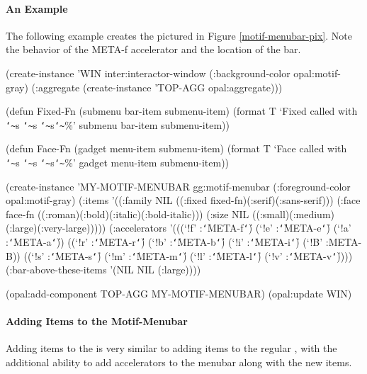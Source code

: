 \begin{group}
\paragraph{An Example}

The following example creates the  pictured in Figure
\ref{motif-menubar-pix}.  Note the behavior of the META-f accelerator and the
location of the bar.


\begin{programexample}
(create-instance 'WIN inter:interactor-window
  (:background-color opal:motif-gray)
  (:aggregate (create-instance 'TOP-AGG opal:aggregate)))

(defun Fixed-Fn (submenu bar-item submenu-item)
  (format T `Fixed called with {\tt\char`\~}s {\tt\char`\~}s {\tt\char`\~}s{\tt\char`\~}\%' submenu bar-item submenu-item))

(defun Face-Fn (gadget menu-item submenu-item)
  (format T `Face called with {\tt\char`\~}s {\tt\char`\~}s {\tt\char`\~}s{\tt\char`\~}\%'
	  gadget menu-item submenu-item))

(create-instance 'MY-MOTIF-MENUBAR gg:motif-menubar
  (:foreground-color opal:motif-gray)
  (:items
   '((:family NIL
	      ((:fixed fixed-fn)(:serif)(:sans-serif)))
     (:face face-fn
	    ((:roman)(:bold)(:italic)(:bold-italic)))
     (:size NIL
	    ((:small)(:medium)(:large)(:very-large)))))
  (:accelerators
   '(((`!f' :{\tt\char`\|}META-f{\tt\char`\|}) (`!e' :{\tt\char`\|}META-e{\tt\char`\|}) (`!a' :{\tt\char`\|}META-a{\tt\char`\|}))
     ((`!r' :{\tt\char`\|}META-r{\tt\char`\|}) (`!b' :{\tt\char`\|}META-b{\tt\char`\|}) (`!i' :{\tt\char`\|}META-i{\tt\char`\|}) (`!B' :META-B))
     ((`!s' :{\tt\char`\|}META-s{\tt\char`\|}) (`!m' :{\tt\char`\|}META-m{\tt\char`\|}) (`!l' :{\tt\char`\|}META-l{\tt\char`\|}) (`!v' :{\tt\char`\|}META-v{\tt\char`\|}))))
  (:bar-above-these-items
   '(NIL
     NIL
     (:large))))

(opal:add-component TOP-AGG MY-MOTIF-MENUBAR)
(opal:update WIN)
\end{programexample}
\end{group}


\paragraph{Adding Items to the Motif-Menubar}

Adding items to the  is very similar to adding items to
the regular , with the additional ability to add accelerators
to the menubar along with the new items.

